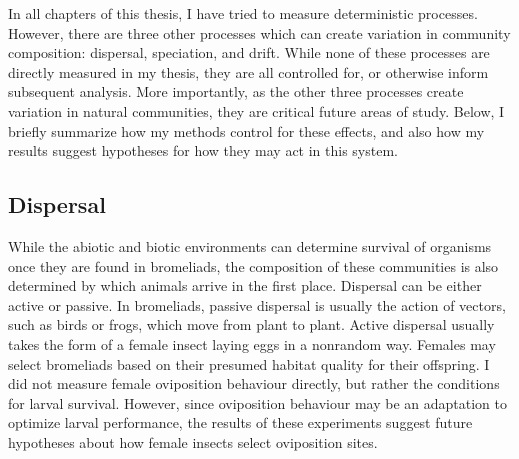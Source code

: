 In all chapters of this thesis, I have tried to measure deterministic
processes. However, there are three other processes which can create
variation in community composition: dispersal, speciation, and drift.
While none of these processes are directly measured in my thesis, they
are all controlled for, or otherwise inform subsequent analysis. More
importantly, as the other three processes create variation in natural
communities, they are critical future areas of study. Below, I briefly
summarize how my methods control for these effects, and also how my
results suggest hypotheses for how they may act in this system.

\subsection{Dispersal}\label{dispersal}

While the abiotic and biotic environments can determine survival of
organisms once they are found in bromeliads, the composition of these
communities is also determined by which animals arrive in the first
place. Dispersal can be either active or passive. In bromeliads, passive
dispersal is usually the action of vectors, such as birds or frogs,
which move from plant to plant. Active dispersal usually takes the form
of a female insect laying eggs in a nonrandom way. Females may select
bromeliads based on their presumed habitat quality for their offspring.
I did not measure female oviposition behaviour directly, but rather the
conditions for larval survival. However, since oviposition behaviour may
be an adaptation to optimize larval performance, the results of these
experiments suggest future hypotheses about how female insects select
oviposition sites.


